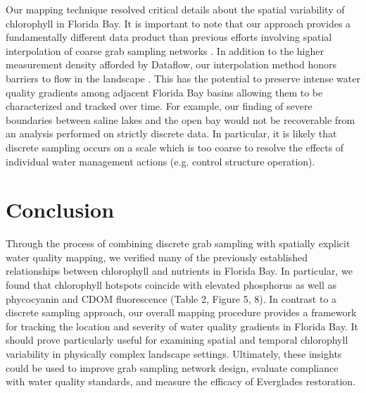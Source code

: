 Our mapping technique resolved critical details about the spatial variability of chlorophyll in Florida Bay. It is important to note that our approach provides a fundamentally different data product than previous efforts involving spatial interpolation of coarse grab sampling networks \citep{fourqurean1993process}. In addition to the higher measurement density afforded by Dataflow, our interpolation method honors barriers to flow in the landscape \citep{stachelek_application_2015}. This has the potential to preserve intense water quality gradients among adjacent Florida Bay basins allowing them to be characterized and tracked over time. For example, our finding of severe boundaries between saline lakes and the open bay would not be recoverable from an analysis performed on strictly discrete data. In particular, it is likely that discrete sampling occurs on a scale which is too coarse to resolve the effects of individual water management actions (e.g. control structure operation).

\section{Conclusion}
\label{conclusion}

	Through the process of combining discrete grab sampling with spatially explicit water quality mapping, we verified many of the previously established relationships between chlorophyll and nutrients in Florida Bay. In particular, we found that chlorophyll hotspots coincide with elevated phosphorus as well as phycocyanin and CDOM fluorescence (Table 2, Figure 5, 8). In contrast to a discrete sampling approach, our overall mapping procedure provides a framework for tracking the location and severity of water quality gradients in Florida Bay. It should prove particularly useful for examining spatial and temporal chlorophyll variability in physically complex landscape settings.	Ultimately, these insights could be used to improve grab sampling network design, evaluate compliance with water quality standards, and measure the efficacy of Everglades restoration.


%


